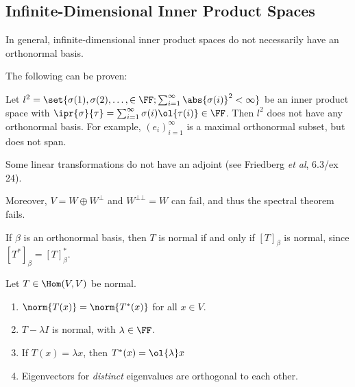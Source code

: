 \documentclass[11pt]{scrartcl}
\begin{document}
\subsection{Infinite-Dimensional Inner Product Spaces}

In general, infinite-dimensional inner product spaces do not necessarily have an orthonormal basis.

The following can be proven:

\begin{example}
  Let $l^2 = \set{\sigma(1), \sigma(2), \dots, \in \FF; \sum_{i=1}^{\infty}\abs{\sigma(i)}^2 < \infty}$ be an inner product space with $\ipr{\sigma}{\tau} = \sum_{i=1}^{\infty}\sigma(i)\ol{\tau(i)} \in \FF$. Then $l^2$ does not have any orthonormal basis. For example, $(e_i)_{i=1}^{\infty}$ is a maximal orthonormal subset, but does not span.

  Some linear transformations do not have an adjoint (see Friedberg \textit{et al}, 6.3/ex 24).

  Moreover, $V  = W\oplus W^{\bot}$ and $W^{\bot \bot} = W$ can fail, and thus the spectral theorem fails.
\end{example}

\begin{remark}
If $\beta$ is an orthonormal basis, then $T$ is normal if and only if $[T]_{\beta}$ is normal, since $[T^{*}]_{\beta} = [T]^{*}_{\beta}$.
\end{remark}

\begin{theorem}
  Let $T \in \Hom(V,V)$ be normal.

  \begin{enumerate}[label=\alph*)]
  \item $\norm{T(x)} = \norm{T^{*}(x)}$ for all $x\in V$.
  \item $T-\lambda I$ is normal, with $\lambda \in \FF$.
  \item If $T(x) = \lambda x$, then $T^{*}(x) = \ol{\lambda}x$
  \item Eigenvectors for \textit{distinct} eigenvalues are orthogonal to each other.
  \end{enumerate}
\end{theorem}
\end{document}
